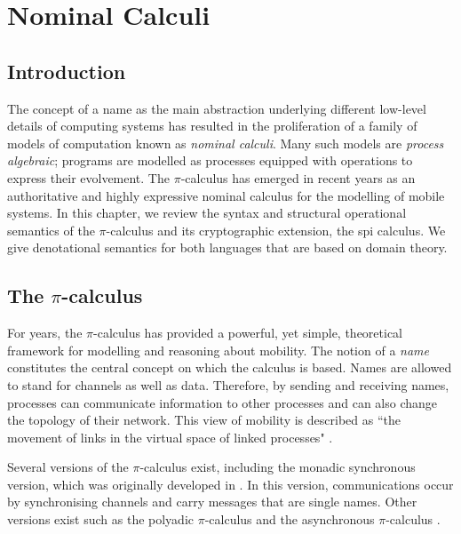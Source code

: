 \documentclass[10pt,a4paper,final,oneside,fleqn]{book}
\begin{document}
\chapter{Nominal Calculi}
\section{Introduction}
The concept of a name as the main abstraction underlying different low-level details of computing systems has resulted in the proliferation of a family of models of computation known as {\itshape nominal calculi\/}.  Many such models are {\itshape process algebraic\/}; programs are modelled as processes equipped with operations to express their evolvement. The $\pi$-calculus has emerged in recent years as an authoritative and highly expressive nominal calculus for the modelling of mobile systems. In this chapter, we review the syntax and structural operational semantics of the $\pi$-calculus and its cryptographic extension, the spi calculus.  We give denotational semantics for both languages that are based on domain theory.
\section{The $\pi$-calculus}
For years, the $\pi$-calculus has provided a powerful, yet simple, theoretical framework for modelling and reasoning about mobility.  The notion of a {\itshape name\/} constitutes the central concept on which the calculus is based.  Names are allowed to stand for channels as well as data.  Therefore, by sending and receiving names, processes can communicate information to other processes and can also change the topology of their network.  This view of mobility is described as ``the movement of links in the virtual space of linked processes" \cite[II-8]{milner2}.

Several versions of the $\pi$-calculus exist, including the monadic synchronous version, which was originally developed in \cite{milner1}.  In this version, communications occur by synchronising channels and carry messages that are single names. Other versions exist such as the polyadic $\pi$-calculus \cite{milner4} and the asynchronous $\pi$-calculus \cite{boudol1,honda2}.
\end{document}
